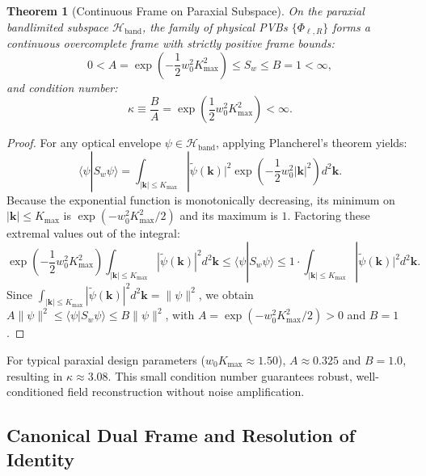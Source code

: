 \documentclass[11pt,a4paper]{article}
\newtheorem{theorem}{Theorem}
\begin{document}
\begin{theorem}[Continuous Frame on Paraxial Subspace]
On the paraxial bandlimited subspace $\mathcal{H}_{\text{band}}$, the family of physical PVBs $\{\Phi_{\ell, R}\}$ forms a continuous overcomplete frame with strictly positive frame bounds:
\begin{equation}
\boxed{0 < A = \exp\left(-\frac{1}{2} w_0^2 K_{\max}^2\right) \le S_w \le B = 1 < \infty,}
\end{equation}
and condition number:
\begin{equation}
\kappa \equiv \frac{B}{A} = \exp\left(\frac{1}{2} w_0^2 K_{\max}^2\right) < \infty.
\end{equation}
\end{theorem}

\begin{proof}
For any optical envelope $\psi \in \mathcal{H}_{\text{band}}$, applying Plancherel's theorem yields:
\begin{equation}
\langle \psi | S_w \psi \rangle = \int_{|\mathbf{k}| \le K_{\max}} |\widetilde{\psi}(\mathbf{k})|^2 \exp\left(-\frac{1}{2} w_0^2 |\mathbf{k}|^2\right) d^2\mathbf{k}.
\end{equation}
Because the exponential function is monotonically decreasing, its minimum on $|\mathbf{k}| \le K_{\max}$ is $\exp(-w_0^2 K_{\max}^2 / 2)$ and its maximum is $1$. Factoring these extremal values out of the integral:
\begin{equation}
\exp\left(-\frac{1}{2} w_0^2 K_{\max}^2\right) \int_{|\mathbf{k}| \le K_{\max}} |\widetilde{\psi}(\mathbf{k})|^2 d^2\mathbf{k} \le \langle \psi | S_w \psi \rangle \le 1 \cdot \int_{|\mathbf{k}| \le K_{\max}} |\widetilde{\psi}(\mathbf{k})|^2 d^2\mathbf{k}.
\end{equation}
Since $\int_{|\mathbf{k}| \le K_{\max}} |\widetilde{\psi}(\mathbf{k})|^2 d^2\mathbf{k} = \|\psi\|^2$, we obtain $A \|\psi\|^2 \le \langle \psi | S_w \psi \rangle \le B \|\psi\|^2$, with $A = \exp(-w_0^2 K_{\max}^2 / 2) > 0$ and $B = 1$.
\end{proof}

For typical paraxial design parameters ($w_0 K_{\max} \approx 1.50$), $A \approx 0.325$ and $B = 1.0$, resulting in $\kappa \approx 3.08$. This small condition number guarantees robust, well-conditioned field reconstruction without noise amplification.

\subsection{Canonical Dual Frame and Resolution of Identity}
\end{document}
